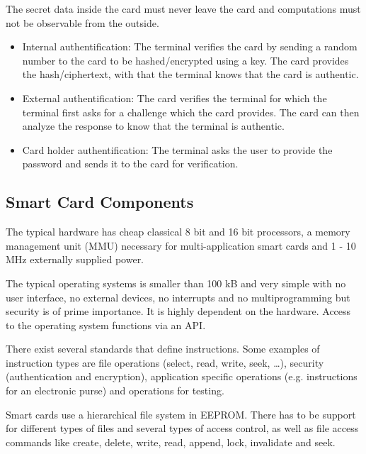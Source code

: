 \begin{myremark} The secret data inside the card must never leave the card and computations must not be observable from the outside.
\end{myremark}
\begin{mytitle} \hfill
\begin{itemize}
    \item Internal authentification: The terminal verifies the card by sending a random number to the card to be hashed/encrypted using a key. The card provides the hash/ciphertext, with that the terminal knows that the card is authentic.
    \item External authentification: The card verifies the terminal for which the terminal first asks for a challenge which the card provides. The card can then analyze the response to know that the terminal is authentic. 
    \item Card holder authentification: The terminal asks the user to provide the password and sends it to the card for verification.
\end{itemize} 
\end{mytitle}
\subsection{Smart Card Components}
\begin{mytitle} The typical hardware has cheap classical 8 bit and 16 bit processors, a memory management unit (MMU) necessary for multi-application smart cards and 1 - 10 MHz externally supplied power.
\end{mytitle}
\begin{mytitle} The typical operating systems is smaller than 100 kB and very simple with no user interface, no external devices, no interrupts and no multiprogramming but security is of prime importance. It is highly dependent on the hardware. Access to the operating system functions via an API.
\end{mytitle}
\begin{mytitle} There exist several standards that define instructions. Some examples of instruction types are file operations (select, read, write, seek, \ldots), security (authentication and encryption), application specific operations (e.g. instructions for an electronic purse) and operations for testing.
\end{mytitle}
\begin{mytitle} Smart cards use a hierarchical file system in EEPROM. There has to be support for different types of files and several types of access control, as well as file access commands like create, delete, write, read, append, lock, invalidate and seek.
\end{mytitle}
\newpage
